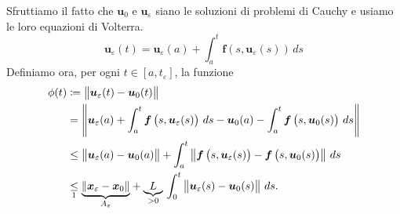 {\begin{enumerate}
        Sfruttiamo il fatto che $ \bm{u}_0 $ e $ \bm{u}_{ \varepsilon} $ siano le soluzioni di problemi di Cauchy e usiamo le loro equazioni di Volterra. \[
            \bm{u}_{ \varepsilon} (t) =\bm{u}_{ \varepsilon} (a) + \int_{a}^{t} \bm{f}\left(s, \bm{u}_{ \varepsilon}(s)\right) \,ds
        \]Definiamo ora, per ogni $ t \in [a,t_{ \varepsilon} ] $, la funzione \begin{align*}
            \phi(t) &\coloneq \norma{\bm{u}_{ \varepsilon}(t)-\bm{u}_{ 0}(t)}\\ &= \norma{%
            \bm{u}_{ \varepsilon}(a) + \int_{a}^{t} \bm{f}\left(s,\bm{u}_{ \varepsilon}(s)\right) \,ds - \bm{u}_0(a) - \int_{a}^{t} \bm{f}\left(s, \bm{u}_0(s)\right)\,ds 
            }\\ 
            &\le \norma{\bm{u}_{ \varepsilon}(a)-\bm{u}_0(a)} + \int_{a}^{t}\norma{\bm{f}\left(s, \bm{u}_{ \varepsilon}(s)\right) - \bm{f}\left(s, \bm{u}_0(s)\right)}\,ds \\ 
            &\underset{\footnotemark}{\le} \parentesi{A_{ \varepsilon} }{%
                \norma{\bm{x}_{ \varepsilon} -\bm{x}_0} 
            } + \underbrace{L}_{>0}\,\int_{0}^{t}\norma{\bm{u}_{ \varepsilon}(s) - \bm{u}_0(s)}\,ds .
        \end{align*} 


\end{enumerate}}
